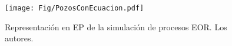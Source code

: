 \begin{figure}[h]
\centering%
\texttt{[image: Fig/PozosConEcuacion.pdf]}%
\caption[Representación en EP de la simulación de procesos EOR.]{Representación en EP de la simulación de procesos EOR. Los autores.} \label{fig:PSComplete}
\end{figure}

